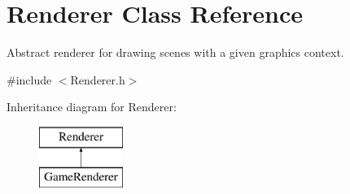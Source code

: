 \hypertarget{class_renderer}{}\section{Renderer Class Reference}
\label{class_renderer}


Abstract renderer for drawing scenes with a given graphics context.  




{\ttfamily \#include $<$Renderer.\+h$>$}

Inheritance diagram for Renderer\+:\begin{figure}[H]
\begin{center}
\leavevmode
\includegraphics[height=2.000000cm]{class_renderer}
\end{center}
\end{figure}
